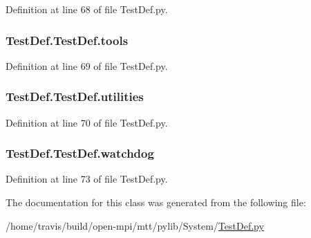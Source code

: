Definition at line 68 of file Test\-Def.\-py.

\hypertarget{class_test_def_1_1_test_def_a2414cc1583555b0c758e0f9f0952a787}{
\subsubsection[{tools}]{\setlength{\rightskip}{0pt plus 5cm}Test\-Def.\-Test\-Def.\-tools}}\label{class_test_def_1_1_test_def_a2414cc1583555b0c758e0f9f0952a787}


Definition at line 69 of file Test\-Def.\-py.

\hypertarget{class_test_def_1_1_test_def_a0b9ea6f06c02401ad62e06c4cfd80bd2}{
\subsubsection[{utilities}]{\setlength{\rightskip}{0pt plus 5cm}Test\-Def.\-Test\-Def.\-utilities}}\label{class_test_def_1_1_test_def_a0b9ea6f06c02401ad62e06c4cfd80bd2}


Definition at line 70 of file Test\-Def.\-py.

\hypertarget{class_test_def_1_1_test_def_a40da46aa95507cffa798cb152fa69e27}{
\subsubsection[{watchdog}]{\setlength{\rightskip}{0pt plus 5cm}Test\-Def.\-Test\-Def.\-watchdog}}\label{class_test_def_1_1_test_def_a40da46aa95507cffa798cb152fa69e27}


Definition at line 73 of file Test\-Def.\-py.



The documentation for this class was generated from the following file\-:\begin{DoxyCompactItemize}
\item 
/home/travis/build/open-\/mpi/mtt/pylib/\-System/\hyperlink{_test_def_8py}{Test\-Def.\-py}\end{DoxyCompactItemize}
